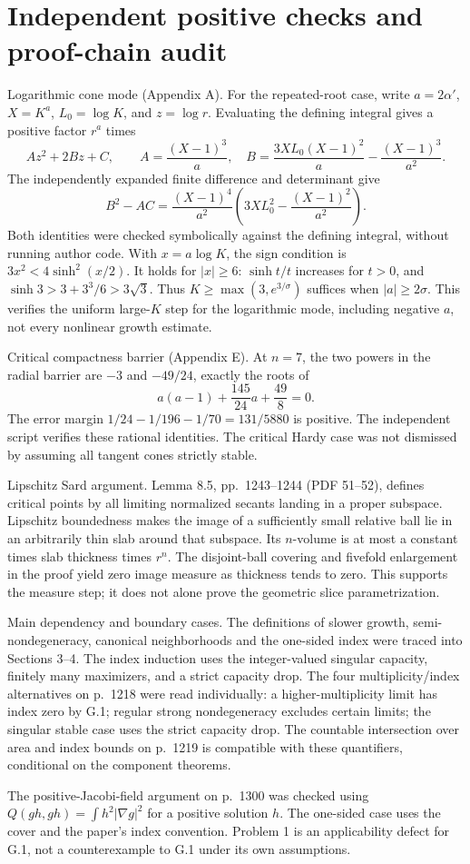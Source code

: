 \documentclass[10pt]{article}
\begin{document}
\section*{Independent positive checks and proof-chain audit}
Logarithmic cone mode (Appendix A). For the repeated-root case, write \(a=2\alpha'\), \(X=K^a\), \(L_0=\log K\), and \(z=\log r\). Evaluating the defining integral gives a positive factor \(r^a\) times \[Az^2+2Bz+C,\qquad
 A=\frac{(X-1)^3}{a},\quad
 B=\frac{3XL_0(X-1)^2}{a}-\frac{(X-1)^3}{a^2}.\] The independently expanded finite difference and determinant give \[B^2-AC=\frac{(X-1)^4}{a^2}
 \left(3XL_0^2-\frac{(X-1)^2}{a^2}\right).\] Both identities were checked symbolically against the defining integral, without running author code. With \(x=a\log K\), the sign condition is \(3x^2<4\sinh^2(x/2)\). It holds for \(|x|\geq6\): \(\sinh t/t\) increases for \(t>0\), and \(\sinh3>3+3^3/6>3\sqrt3\). Thus \(K\geq\max(3,e^{3/\sigma})\) suffices when \(|a|\geq2\sigma\). This verifies the uniform large-\(K\) step for the logarithmic mode, including negative \(a\), not every nonlinear growth estimate.\par
Critical compactness barrier (Appendix E). At \(n=7\), the two powers in the radial barrier are \(-3\) and \(-49/24\), exactly the roots of \[a(a-1)+\frac{145}{24}a+\frac{49}{8}=0.\] The error margin \(1/24-1/196-1/70=131/5880\) is positive. The independent script verifies these rational identities. The critical Hardy case was not dismissed by assuming all tangent cones strictly stable.\par
Lipschitz Sard argument. Lemma 8.5, pp. 1243–1244 (PDF 51–52), defines critical points by all limiting normalized secants landing in a proper subspace. Lipschitz boundedness makes the image of a sufficiently small relative ball lie in an arbitrarily thin slab around that subspace. Its \(n\)-volume is at most a constant times slab thickness times \(r^n\). The disjoint-ball covering and fivefold enlargement in the proof yield zero image measure as thickness tends to zero. This supports the measure step; it does not alone prove the geometric slice parametrization.\par
Main dependency and boundary cases. The definitions of slower growth, semi-nondegeneracy, canonical neighborhoods and the one-sided index were traced into Sections 3–4. The index induction uses the integer-valued singular capacity, finitely many maximizers, and a strict capacity drop. The four multiplicity/index alternatives on p. 1218 were read individually: a higher-multiplicity limit has index zero by G.1; regular strong nondegeneracy excludes certain limits; the singular stable case uses the strict capacity drop. The countable intersection over area and index bounds on p. 1219 is compatible with these quantifiers, conditional on the component theorems.\par
The positive-Jacobi-field argument on p. 1300 was checked using \(Q(gh,gh)=\int h^2|\nabla g|^2\) for a positive solution \(h\). The one-sided case uses the cover and the paper’s index convention. Problem 1 is an applicability defect for G.1, not a counterexample to G.1 under its own assumptions.\par
\end{document}
